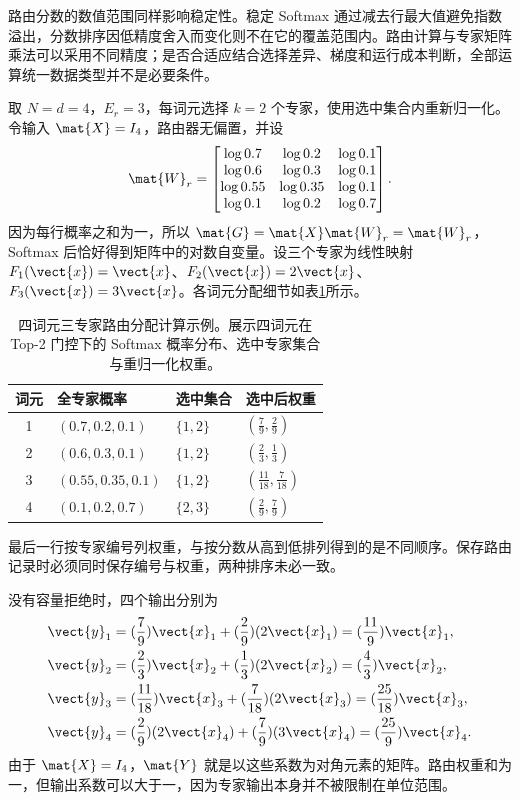 \documentclass[../textbook.tex]{subfiles}
\begin{document}
路由分数的数值范围同样影响稳定性。稳定 Softmax 通过减去行最大值避免指数溢出，分数排序因低精度舍入而变化则不在它的覆盖范围内。路由计算与专家矩阵乘法可以采用不同精度；是否合适应结合选择差异、梯度和运行成本判断，全部运算统一数据类型并不是必要条件。

\begin{example}
取 $N=d=4$，$E_r=3$，每词元选择 $k=2$ 个专家，使用选中集合内重新归一化。令输入 $\mat{X}=I_4$，路由器无偏置，并设
\begin{equation*}
 \mat{W}_r=\begin{bmatrix}
 \log0.7&\log0.2&\log0.1\\
 \log0.6&\log0.3&\log0.1\\
 \log0.55&\log0.35&\log0.1\\
 \log0.1&\log0.2&\log0.7
 \end{bmatrix}.
\end{equation*}
因为每行概率之和为一，所以 $\mat{G}=\mat{X}\mat{W}_r=\mat{W}_r$，Softmax 后恰好得到矩阵中的对数自变量。设三个专家为线性映射 $F_1(\vect{x})=\vect{x}$、$F_2(\vect{x})=2\vect{x}$、$F_3(\vect{x})=3\vect{x}$。各词元分配细节如表\ref{tab:moe-example-routing}所示。

\begin{table}[htbp]
\centering
\caption[四词元三专家路由分配计算示例]{四词元三专家路由分配计算示例。展示四词元在 Top-2 门控下的 Softmax 概率分布、选中专家集合与重归一化权重。}\label{tab:moe-example-routing}
\begin{tabular}{clll}
\toprule 词元 & 全专家概率 & 选中集合 & 选中后权重\\\midrule
1 & $(0.7,0.2,0.1)$ & $\{1,2\}$ & $(\frac{7}{9},\frac{2}{9})$\\
2 & $(0.6,0.3,0.1)$ & $\{1,2\}$ & $(\frac{2}{3},\frac{1}{3})$\\
3 & $(0.55,0.35,0.1)$ & $\{1,2\}$ & $(\frac{11}{18},\frac{7}{18})$\\
4 & $(0.1,0.2,0.7)$ & $\{2,3\}$ & $(\frac{2}{9},\frac{7}{9})$\\
\bottomrule
\end{tabular}
\end{table}
最后一行按专家编号列权重，与按分数从高到低排列得到的是不同顺序。保存路由记录时必须同时保存编号与权重，两种排序未必一致。

没有容量拒绝时，四个输出分别为
\begin{align*}
 \vect{y}_1&=(\frac{7}{9})\vect{x}_1+(\frac{2}{9})(2\vect{x}_1)=(\frac{11}{9})\vect{x}_1,\\
 \vect{y}_2&=(\frac{2}{3})\vect{x}_2+(\frac{1}{3})(2\vect{x}_2)=(\frac{4}{3})\vect{x}_2,\\
 \vect{y}_3&=(\frac{11}{18})\vect{x}_3+(\frac{7}{18})(2\vect{x}_3)=(\frac{25}{18})\vect{x}_3,\\
 \vect{y}_4&=(\frac{2}{9})(2\vect{x}_4)+(\frac{7}{9})(3\vect{x}_4)=(\frac{25}{9})\vect{x}_4.
\end{align*}
由于 $\mat{X}=I_4$，$\mat{Y}$ 就是以这些系数为对角元素的矩阵。路由权重和为一，但输出系数可以大于一，因为专家输出本身并不被限制在单位范围。


\end{example}
\end{document}
